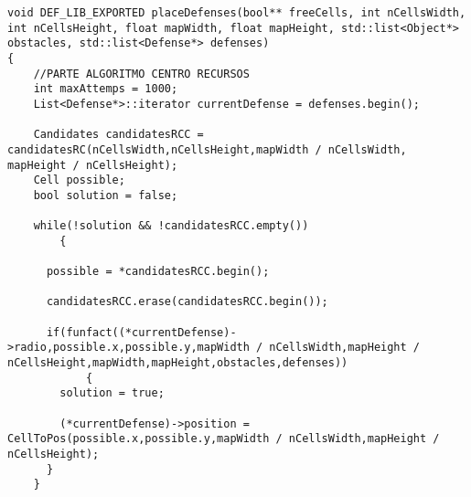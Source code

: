 \begin{lstlisting}
void DEF_LIB_EXPORTED placeDefenses(bool** freeCells, int nCellsWidth, int nCellsHeight, float mapWidth, float mapHeight, std::list<Object*> obstacles, std::list<Defense*> defenses)
{
	//PARTE ALGORITMO CENTRO RECURSOS
    int maxAttemps = 1000;
    List<Defense*>::iterator currentDefense = defenses.begin();

    Candidates candidatesRCC = candidatesRC(nCellsWidth,nCellsHeight,mapWidth / nCellsWidth, mapHeight / nCellsHeight);
    Cell possible;
    bool solution = false;

    while(!solution && !candidatesRCC.empty())
		{

      possible = *candidatesRCC.begin();

      candidatesRCC.erase(candidatesRCC.begin());

      if(funfact((*currentDefense)->radio,possible.x,possible.y,mapWidth / nCellsWidth,mapHeight / nCellsHeight,mapWidth,mapHeight,obstacles,defenses))
			{
        solution = true;

        (*currentDefense)->position = CellToPos(possible.x,possible.y,mapWidth / nCellsWidth,mapHeight / nCellsHeight);
      }
    }
\end{lstlisting}
